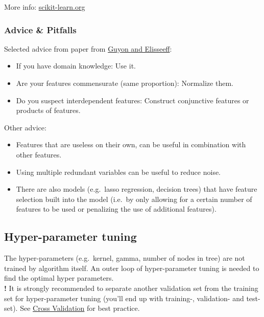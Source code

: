 \documentclass[
]{book}
\begin{document}
More info:
\href{https://scikit-learn.org/stable/modules/generated/sklearn.feature_selection.SequentialFeatureSelector.html}{scikit-learn.org}

\hypertarget{advice-pitfalls}{%
\subsubsection{Advice \& Pitfalls}\label{advice-pitfalls}}

Selected advice from paper from \href{https://jmlr.csail.mit.edu/papers/volume3/guyon03a/guyon03a.pdf}{Guyon and
Elisseeff}:

\begin{itemize}
\item
  If you have domain knowledge: Use it.
\item
  Are your features commensurate (same proportion): Normalize them.
\item
  Do you suspect interdependent features: Construct conjunctive
  features or products of features.
\end{itemize}

Other advice:

\begin{itemize}
\item
  Features that are useless on their own, can be useful in combination
  with other features.
\item
  Using multiple redundant variables can be useful to reduce noise.
\item
  There are also models (e.g.~lasso regression, decision trees) that
  have feature selection built into the model (i.e.~by only allowing
  for a certain number of features to be used or penalizing the use of
  additional features).
\end{itemize}

\hypertarget{hyper-parameter-tuning}{%
\subsection{Hyper-parameter tuning}\label{hyper-parameter-tuning}}

The hyper-parameters (e.g.~kernel, gamma, number of nodes in tree) are
not trained by algorithm itself. An outer loop of hyper-parameter tuning
is needed to find the optimal hyper parameters.\\
\textbf{!} It is strongly recommended to separate another validation set from
the training set for hyper-parameter tuning (you'll end up with
training-, validation- and test-set). See \protect\hyperlink{crossval}{Cross Validation}
for best practice.
\end{document}
